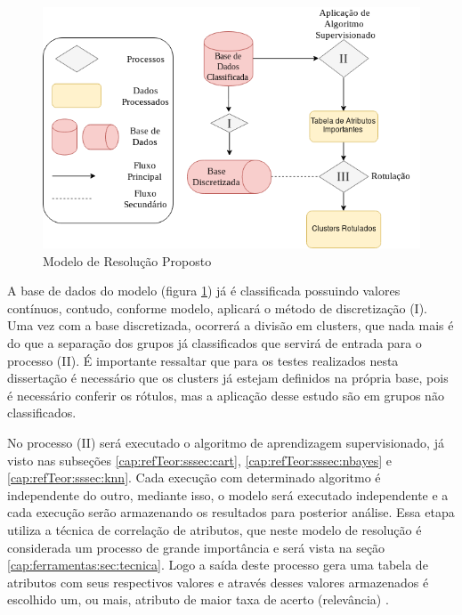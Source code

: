 \begin{figure}[h!]
        \centering
        \includegraphics[scale=0.6]{figs/modeloResolucao.png}
        \caption{Modelo de Resolução Proposto} \label{fig:modeloresolucao}
\end{figure}

A base de dados do modelo (figura \ref{fig:modeloresolucao}) já é classificada possuindo valores contínuos, contudo, conforme modelo, aplicará o método de discretização (I). Uma vez com a base discretizada, ocorrerá a divisão em clusters, que nada mais é do que a separação dos grupos já classificados que servirá de entrada para o processo (II). É importante ressaltar que para os testes realizados nesta dissertação é necessário que os clusters já estejam definidos na própria base, pois é necessário conferir os rótulos, mas a aplicação desse estudo são em grupos não classificados.

No processo (II) será executado o algoritmo de aprendizagem supervisionado, já visto nas subseções \ref{cap:refTeor:sssec:cart}, \ref{cap:refTeor:sssec:nbayes} e \ref{cap:refTeor:sssec:knn}. Cada execução com determinado  algoritmo é independente do outro, mediante isso, o modelo será executado independente e a cada execução serão armazenando os resultados para posterior análise. Essa etapa utiliza a técnica de correlação de atributos, que neste modelo de resolução é considerada um processo de grande importância e será vista na seção   \ref{cap:ferramentas:sec:tecnica}. Logo a saída deste processo gera uma tabela de atributos com seus respectivos valores e através desses valores armazenados é escolhido um, ou mais, atributo de maior taxa de acerto (relevância) . 




